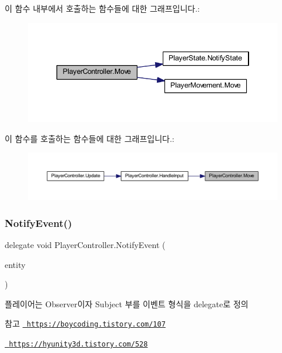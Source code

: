 이 함수 내부에서 호출하는 함수들에 대한 그래프입니다.\+:\nopagebreak
\begin{figure}[H]
\begin{center}
\leavevmode
\includegraphics[width=346pt]{dc/dde/class_player_controller_a74676e263dd0a0a9a03a389fa9758bd6_cgraph}
\end{center}
\end{figure}
이 함수를 호출하는 함수들에 대한 그래프입니다.\+:\nopagebreak
\begin{figure}[H]
\begin{center}
\leavevmode
\includegraphics[width=350pt]{dc/dde/class_player_controller_a74676e263dd0a0a9a03a389fa9758bd6_icgraph}
\end{center}
\end{figure}
\mbox{\label{class_player_controller_a934c7f80b80276620cd60eaaeea7520e}} 
\subsubsection{\texorpdfstring{NotifyEvent()}{NotifyEvent()}}
{\footnotesize\ttfamily delegate void Player\+Controller.\+Notify\+Event (\begin{DoxyParamCaption}\item[{Game\+Object}]{entity }\end{DoxyParamCaption})}



플레이어는 Observer이자 Subject 부를 이벤트 형식을 delegate로 정의 

\begin{DoxySeeAlso}{참고}
\href{https://boycoding.tistory.com/107}{\texttt{ https\+://boycoding.\+tistory.\+com/107}} 

\href{https://hyunity3d.tistory.com/528}{\texttt{ https\+://hyunity3d.\+tistory.\+com/528}} 
\end{DoxySeeAlso}
\mbox{\label{class_player_controller_ae8bc83dffb99867a04be016473ed2c43}} 
